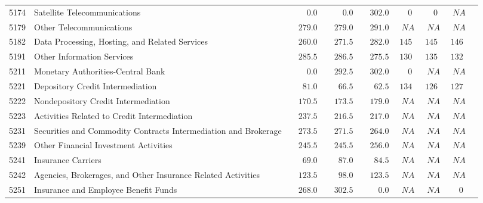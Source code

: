 \documentclass[9pt, oneside]{article}   	%
\begin{document}
\begin{longtable}{lp{3.5 in}ccccccc}
5174  & Satellite Telecommunications & $\phantom{0000}0.0$ & $\phantom{0000}0.0$ & $\phantom{00}302.0$ & $\phantom{00}0$ & $\phantom{00}0$ & $\phantom{0}NA$ \\
5179  & Other Telecommunications & $\phantom{00}279.0$ & $\phantom{00}279.0$ & $\phantom{00}291.0$ & $\phantom{0}NA$ & $\phantom{0}NA$ & $\phantom{0}NA$ \\
5182  & Data Processing, Hosting, and Related Services & $\phantom{00}260.0$ & $\phantom{00}271.5$ & $\phantom{00}282.0$ & $145$ & $145$ & $146$ \\
5191  & Other Information Services & $\phantom{00}285.5$ & $\phantom{00}286.5$ & $\phantom{00}275.5$ & $130$ & $135$ & $132$ \\
5211  & Monetary Authorities-Central Bank & $\phantom{0000}0.0$ & $\phantom{00}292.5$ & $\phantom{00}302.0$ & $\phantom{00}0$ & $\phantom{0}NA$ & $\phantom{0}NA$ \\
5221  & Depository Credit Intermediation & $\phantom{000}81.0$ & $\phantom{000}66.5$ & $\phantom{000}62.5$ & $134$ & $126$ & $127$ \\
5222  & Nondepository Credit Intermediation & $\phantom{00}170.5$ & $\phantom{00}173.5$ & $\phantom{00}179.0$ & $\phantom{0}NA$ & $\phantom{0}NA$ & $\phantom{0}NA$ \\
5223  & Activities Related to Credit Intermediation & $\phantom{00}237.5$ & $\phantom{00}216.5$ & $\phantom{00}217.0$ & $\phantom{0}NA$ & $\phantom{0}NA$ & $\phantom{0}NA$ \\
5231  & Securities and Commodity Contracts Intermediation and Brokerage & $\phantom{00}273.5$ & $\phantom{00}271.5$ & $\phantom{00}264.0$ & $\phantom{0}NA$ & $\phantom{0}NA$ & $\phantom{0}NA$ \\
5239  & Other Financial Investment Activities & $\phantom{00}245.5$ & $\phantom{00}245.5$ & $\phantom{00}256.0$ & $\phantom{0}NA$ & $\phantom{0}NA$ & $\phantom{0}NA$ \\
5241  & Insurance Carriers & $\phantom{000}69.0$ & $\phantom{000}87.0$ & $\phantom{000}84.5$ & $\phantom{0}NA$ & $\phantom{0}NA$ & $\phantom{0}NA$ \\
5242  & Agencies, Brokerages, and Other Insurance Related Activities & $\phantom{00}123.5$ & $\phantom{000}98.0$ & $\phantom{00}123.5$ & $\phantom{0}NA$ & $\phantom{0}NA$ & $\phantom{0}NA$ \\
5251  & Insurance and Employee Benefit Funds & $\phantom{00}268.0$ & $\phantom{00}302.5$ & $\phantom{0000}0.0$ & $\phantom{0}NA$ & $\phantom{0}NA$ & $\phantom{00}0$ \\

\end{longtable}
\end{document}
